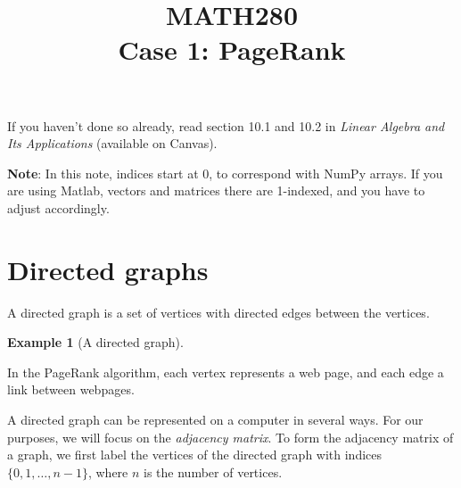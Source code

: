 \documentclass[a4paper]{scrartcl}
\title{MATH280\\ Case 1: PageRank}
\date{}
\theoremstyle{definition}
\newtheorem*{example}{Example}
\begin{document}
	\maketitle
	
	If you haven't done so already, read section 10.1 and 10.2 in \emph{Linear Algebra and Its Applications} (available on Canvas).
	
	\textbf{Note}: In this note, indices start at 0, to correspond with NumPy arrays. If you are using Matlab, vectors and matrices there are 1-indexed, and you have to adjust accordingly.
	
	\section{Directed graphs}
	A directed graph is a set of vertices with directed edges between the vertices.
	\begin{example}[A directed graph]
	\phantom{x}\\
	\end{example}
	In the PageRank algorithm, each vertex represents a web page, and each edge a link between webpages.
	
	A directed graph can be represented on a computer in several ways. For our purposes, we will focus on the \emph{adjacency matrix}. To form the adjacency matrix of a graph, we first label the vertices of the directed graph with indices  $\{0,1,\dotsc, n-1\}$, where $n$ is the number of vertices.
	
\end{document}
